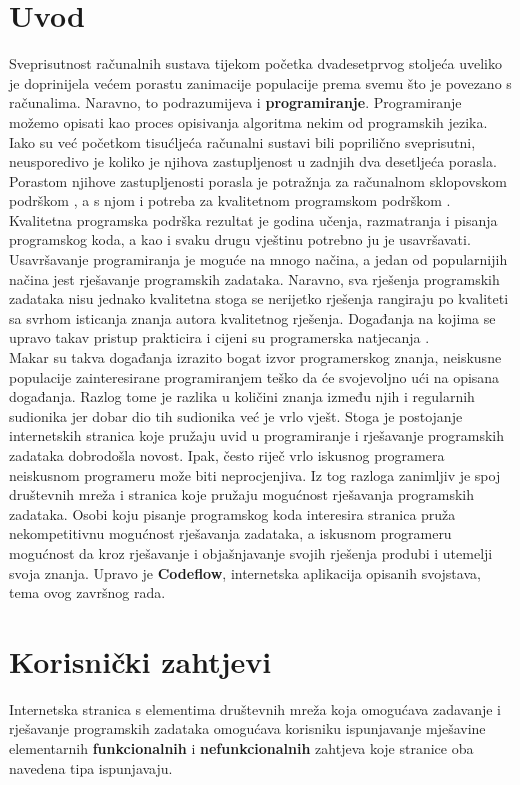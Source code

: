 \documentclass[times, utf8, zavrsni]{fer}
\begin{document}
	\chapter{Uvod}
	Sveprisutnost računalnih sustava tijekom početka dvadesetprvog stoljeća uveliko je doprinijela većem porastu zanimacije populacije prema svemu što je povezano s računalima.  Naravno, to podrazumijeva i  \textbf{programiranje}. Programiranje možemo opisati kao proces opisivanja algoritma nekim od programskih jezika.\\
	Iako su već početkom tisućljeća računalni sustavi bili poprilično sveprisutni, neusporedivo je koliko je njihova zastupljenost u zadnjih dva desetljeća porasla. Porastom njihove zastupljenosti porasla je potražnja za računalnom sklopovskom podrškom , a s njom i potreba za kvalitetnom programskom podrškom . Kvalitetna programska podrška rezultat je godina učenja, razmatranja i pisanja programskog koda, a kao i svaku drugu vještinu potrebno ju je usavršavati. Usavršavanje programiranja je moguće na mnogo načina, a jedan od popularnijih načina jest rješavanje programskih zadataka. Naravno, sva rješenja programskih zadataka nisu jednako kvalitetna stoga se nerijetko rješenja rangiraju po kvaliteti sa svrhom isticanja znanja autora kvalitetnog rješenja. Događanja na kojima se upravo takav pristup prakticira i cijeni su programerska natjecanja .\\
	Makar su takva događanja izrazito bogat izvor programerskog znanja, neiskusne populacije zainteresirane programiranjem teško da će svojevoljno ući na opisana događanja. Razlog tome je razlika u količini znanja između njih i regularnih sudionika jer dobar dio tih sudionika već je vrlo vješt. Stoga je postojanje internetskih stranica koje pružaju uvid u programiranje i rješavanje programskih zadataka dobrodošla novost. Ipak, često riječ vrlo iskusnog programera neiskusnom programeru može biti neprocjenjiva. Iz tog razloga zanimljiv je spoj društevnih mreža  i stranica koje pružaju mogućnost rješavanja programskih zadataka. Osobi koju pisanje programskog koda interesira stranica pruža nekompetitivnu mogućnost rješavanja zadataka, a iskusnom programeru mogućnost da kroz rješavanje i objašnjavanje svojih rješenja produbi i utemelji svoja znanja. Upravo je \textbf{Codeflow}, internetska aplikacija opisanih svojstava, tema ovog završnog rada.
	
	\chapter{Korisnički zahtjevi}
	\label{cha:zahtjevi}
	Internetska stranica s elementima društevnih mreža koja omogućava zadavanje i rješavanje programskih zadataka omogućava korisniku ispunjavanje mješavine elementarnih \textbf{funkcionalnih} i \textbf{nefunkcionalnih} zahtjeva koje stranice oba navedena tipa ispunjavaju.
	
\end{document}
